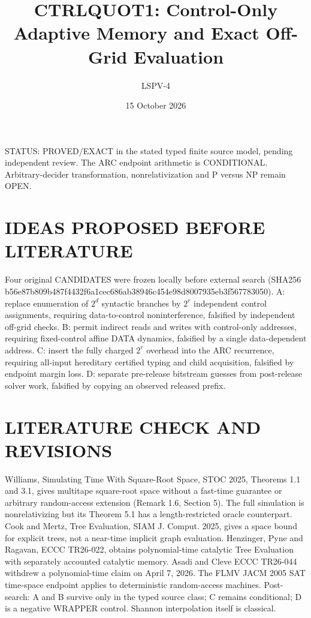 \documentclass[11pt]{article}
\title{CTRLQUOT1: Control-Only Adaptive Memory and Exact Off-Grid Evaluation}
\author{LSPV-4}
\date{15 October 2026}
\begin{document}
\maketitle
\noindent STATUS: PROVED/EXACT in the stated typed finite source model, pending independent review. The ARC endpoint arithmetic is CONDITIONAL. Arbitrary-decider transformation, nonrelativization and P versus NP remain OPEN.
\section{IDEAS PROPOSED BEFORE LITERATURE}
Four original CANDIDATES were frozen locally before external search (SHA256 b56e87b809b487f4432f6a1cec686ab38946c454e98d8007935eb3f567783050).
A: replace enumeration of $2^d$ syntactic branches by $2^r$ independent control assignments, requiring data-to-control noninterference, falsified by independent off-grid checks.
B: permit indirect reads and writes with control-only addresses, requiring fixed-control affine DATA dynamics, falsified by a single data-dependent address.
C: insert the fully charged $2^r$ overhead into the ARC recurrence, requiring all-input hereditary certified typing and child acquisition, falsified by endpoint margin loss.
D: separate pre-release bitstream guesses from post-release solver work, falsified by copying an observed released prefix.
\section{LITERATURE CHECK AND REVISIONS}
Williams, Simulating Time With Square-Root Space, STOC 2025, Theorems 1.1 and 3.1, gives multitape square-root space without a fast-time guarantee or arbitrary random-access extension (Remark 1.6, Section 5). The full simulation is nonrelativizing but its Theorem 5.1 has a length-restricted oracle counterpart. Cook and Mertz, Tree Evaluation, SIAM J. Comput. 2025, gives a space bound for explicit trees, not a near-time implicit graph evaluation. Henzinger, Pyne and Ragavan, ECCC TR26-022, obtains polynomial-time catalytic Tree Evaluation with separately accounted catalytic memory. Asadi and Cleve ECCC TR26-044 withdrew a polynomial-time claim on April 7, 2026. The FLMV JACM 2005 SAT time-space endpoint applies to deterministic random-access machines. Post-search: A and B survive only in the typed source class; C remains conditional; D is a negative WRAPPER control. Shannon interpolation itself is classical.
\end{document}
